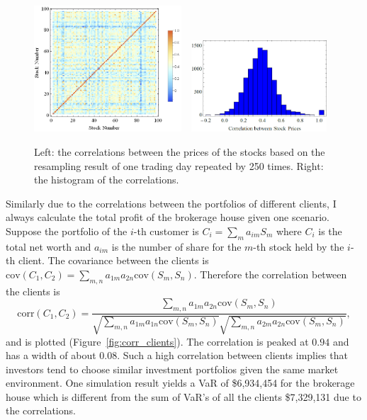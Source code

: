 \documentclass[letterpaper,11pt]{article}
\begin{document}
\begin{figure}[h]
\centering
\includegraphics[width=0.49\textwidth]{corr_stocks.png}\ \ 
\includegraphics[width=0.45\textwidth]{hist_corr_stocks.png}
\caption{Left: the correlations between the prices of the stocks based on the resampling result of one trading day repeated by 250 times.
Right: the histogram of the correlations.}
\label{fig:corr_stocks}
\end{figure}

Similarly due to the correlations between the portfolios of different clients, I always calculate the total profit of the brokerage house given one scenario.
Suppose the portfolio of the $i$-th customer is $C_i=\sum_ma_{im}S_m$ where $C_i$ is the total net worth and $a_{im}$ is the number of share for the $m$-th stock held by the $i$-th client.
The covariance between the clients is $\text{cov}(C_1,C_2)=\sum_{m,n}a_{1m}a_{2n}\text{cov}(S_m,S_n)$.
Therefore the correlation between the clients is
\begin{equation}
\text{corr}(C_1,C_2)=\frac{\sum_{m,n}a_{1m}a_{2n}\text{cov}(S_m,S_n)}{\sqrt{\sum_{m,n}a_{1m}a_{1n}\text{cov}(S_m,S_n)}\sqrt{\sum_{m,n}a_{2m}a_{2n}\text{cov}(S_m,S_n)}},
\end{equation}
and is plotted (Figure~\ref{fig:corr_clients}).
The correlation is peaked at $0.94$ and has a width of about $0.08$.
Such a high correlation between clients implies that investors tend to choose similar investment portfolios given the same market environment.
One simulation result yields a VaR of \$6,934,454 for the brokerage house which is different from the sum of VaR's of all the clients \$7,329,131 due to the correlations.
\end{document}
